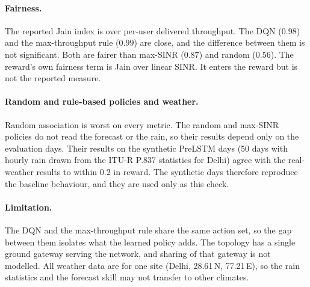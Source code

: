 \documentclass[conference]{IEEEtran}
\begin{document}
\paragraph{Fairness.} The reported Jain index is over per-user delivered throughput. The DQN ($0.98$) and the max-throughput rule ($0.99$) are close, and the difference between them is not significant. Both are fairer than max-SINR ($0.87$) and random ($0.56$). The reward's own fairness term is Jain over linear SINR. It enters the reward but is not the reported measure.

\paragraph{Random and rule-based policies and weather.} Random association is worst on every metric. The random and max-SINR policies do not read the forecast or the rain, so their results depend only on the evaluation days. Their results on the synthetic PreLSTM days (50 days with hourly rain drawn from the ITU-R P.837 statistics for Delhi) agree with the real-weather results to within $0.2$ in reward. The synthetic days therefore reproduce the baseline behaviour, and they are used only as this check.

\paragraph{Limitation.} The DQN and the max-throughput rule share the same action set, so the gap between them isolates what the learned policy adds. The topology has a single ground gateway serving the network, and sharing of that gateway is not modelled. All weather data are for one site (Delhi, 28.61\,N, 77.21\,E), so the rain statistics and the forecast skill may not transfer to other climates.
\end{document}
